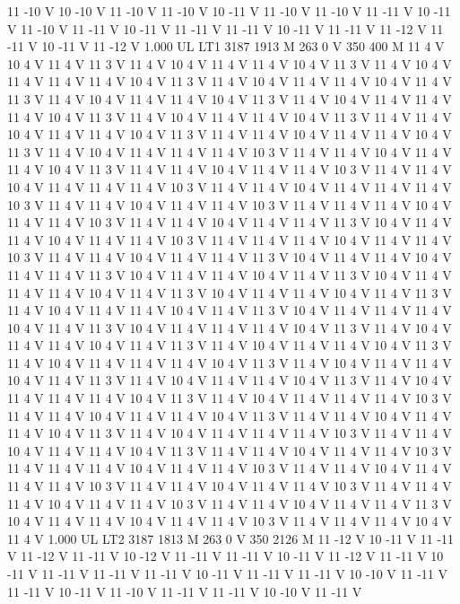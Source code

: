 {11 -10 V
10 -10 V
11 -10 V
11 -10 V
10 -11 V
11 -10 V
11 -10 V
11 -11 V
10 -11 V
11 -10 V
11 -11 V
10 -11 V
11 -11 V
11 -11 V
10 -11 V
11 -11 V
11 -12 V
11 -11 V
10 -11 V
11 -12 V
1.000 UL
LT1
3187 1913 M
263 0 V
350 400 M
11 4 V
10 4 V
11 4 V
11 3 V
11 4 V
10 4 V
11 4 V
11 4 V
10 4 V
11 3 V
11 4 V
10 4 V
11 4 V
11 4 V
11 4 V
10 4 V
11 3 V
11 4 V
10 4 V
11 4 V
11 4 V
10 4 V
11 4 V
11 3 V
11 4 V
10 4 V
11 4 V
11 4 V
10 4 V
11 3 V
11 4 V
10 4 V
11 4 V
11 4 V
11 4 V
10 4 V
11 3 V
11 4 V
10 4 V
11 4 V
11 4 V
10 4 V
11 3 V
11 4 V
11 4 V
10 4 V
11 4 V
11 4 V
10 4 V
11 3 V
11 4 V
11 4 V
10 4 V
11 4 V
11 4 V
10 4 V
11 3 V
11 4 V
10 4 V
11 4 V
11 4 V
11 4 V
10 3 V
11 4 V
11 4 V
10 4 V
11 4 V
11 4 V
10 4 V
11 3 V
11 4 V
11 4 V
10 4 V
11 4 V
11 4 V
10 3 V
11 4 V
11 4 V
10 4 V
11 4 V
11 4 V
11 4 V
10 3 V
11 4 V
11 4 V
10 4 V
11 4 V
11 4 V
11 4 V
10 3 V
11 4 V
11 4 V
10 4 V
11 4 V
11 4 V
10 3 V
11 4 V
11 4 V
11 4 V
10 4 V
11 4 V
11 4 V
10 3 V
11 4 V
11 4 V
10 4 V
11 4 V
11 4 V
11 3 V
10 4 V
11 4 V
11 4 V
10 4 V
11 4 V
11 4 V
10 3 V
11 4 V
11 4 V
11 4 V
10 4 V
11 4 V
11 4 V
10 3 V
11 4 V
11 4 V
10 4 V
11 4 V
11 4 V
11 3 V
10 4 V
11 4 V
11 4 V
10 4 V
11 4 V
11 4 V
11 3 V
10 4 V
11 4 V
11 4 V
10 4 V
11 4 V
11 3 V
10 4 V
11 4 V
11 4 V
11 4 V
10 4 V
11 4 V
11 3 V
10 4 V
11 4 V
11 4 V
10 4 V
11 4 V
11 3 V
11 4 V
10 4 V
11 4 V
11 4 V
10 4 V
11 4 V
11 3 V
10 4 V
11 4 V
11 4 V
11 4 V
10 4 V
11 4 V
11 3 V
10 4 V
11 4 V
11 4 V
11 4 V
10 4 V
11 3 V
11 4 V
10 4 V
11 4 V
11 4 V
10 4 V
11 4 V
11 3 V
11 4 V
10 4 V
11 4 V
11 4 V
10 4 V
11 3 V
11 4 V
10 4 V
11 4 V
11 4 V
11 4 V
10 4 V
11 3 V
11 4 V
10 4 V
11 4 V
11 4 V
10 4 V
11 4 V
11 3 V
11 4 V
10 4 V
11 4 V
11 4 V
10 4 V
11 3 V
11 4 V
10 4 V
11 4 V
11 4 V
11 4 V
10 4 V
11 3 V
11 4 V
10 4 V
11 4 V
11 4 V
11 4 V
10 3 V
11 4 V
11 4 V
10 4 V
11 4 V
11 4 V
10 4 V
11 3 V
11 4 V
11 4 V
10 4 V
11 4 V
11 4 V
10 4 V
11 3 V
11 4 V
10 4 V
11 4 V
11 4 V
11 4 V
10 3 V
11 4 V
11 4 V
10 4 V
11 4 V
11 4 V
10 4 V
11 3 V
11 4 V
11 4 V
10 4 V
11 4 V
11 4 V
10 3 V
11 4 V
11 4 V
11 4 V
10 4 V
11 4 V
11 4 V
10 3 V
11 4 V
11 4 V
10 4 V
11 4 V
11 4 V
11 4 V
10 3 V
11 4 V
11 4 V
10 4 V
11 4 V
11 4 V
10 3 V
11 4 V
11 4 V
11 4 V
10 4 V
11 4 V
11 4 V
10 3 V
11 4 V
11 4 V
10 4 V
11 4 V
11 4 V
11 3 V
10 4 V
11 4 V
11 4 V
10 4 V
11 4 V
11 4 V
10 3 V
11 4 V
11 4 V
11 4 V
10 4 V
11 4 V
1.000 UL
LT2
3187 1813 M
263 0 V
350 2126 M
11 -12 V
10 -11 V
11 -11 V
11 -12 V
11 -11 V
10 -12 V
11 -11 V
11 -11 V
10 -11 V
11 -12 V
11 -11 V
10 -11 V
11 -11 V
11 -11 V
11 -11 V
10 -11 V
11 -11 V
11 -11 V
10 -10 V
11 -11 V
11 -11 V
10 -11 V
11 -10 V
11 -11 V
11 -11 V
10 -10 V
11 -11 V
}
